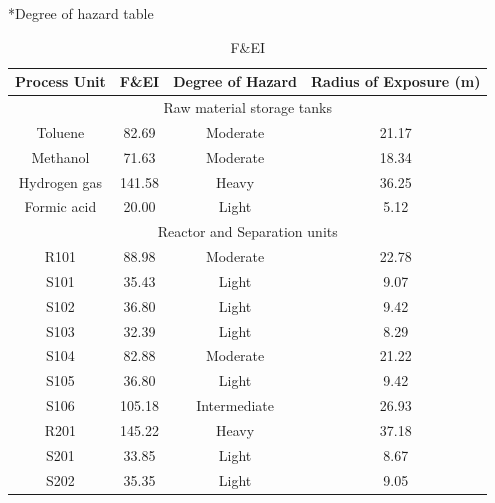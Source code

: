 *Degree of hazard table

\begin{table}[H]
\centering
\caption{F\&EI }
\label{tab:radius}
\begin{tabular}{cccc}
\toprule\textbf{Process   Unit} & \textbf{F\&EI} & \textbf{Degree of Hazard} & \textbf{Radius of   Exposure (m)} \\\bottomrule
\multicolumn{4}{c}{Raw   material storage tanks}   
\\\hline
Toluene                 & 82.69          & Moderate                  & 21.17                              \\
Methanol                & 71.63          & Moderate                  & 18.34                              \\
Hydrogen gas            & 141.58         & Heavy                     & 36.25                              \\
Formic acid             & 20.00          & Light                     & 5.12                               \\\hline
\multicolumn{4}{c}{Reactor and Separation units}                                                        \\\hline
R101                    & 88.98          & Moderate                  & 22.78                              \\
S101                    & 35.43          & Light                     & 9.07                               \\
S102                    & 36.80          & Light                     & 9.42                               \\
S103                    & 32.39          & Light                     & 8.29                               \\
S104                    & 82.88          & Moderate                  & 21.22                              \\
S105                    & 36.80          & Light                     & 9.42                               \\
S106                    & 105.18         & Intermediate              & 26.93                              \\
R201                    & 145.22         & Heavy                     & 37.18                              \\
S201                    & 33.85          & Light                     & 8.67                               \\
S202                    & 35.35          & Light                     & 9.05                               \\

\end{tabular}
\end{table}
